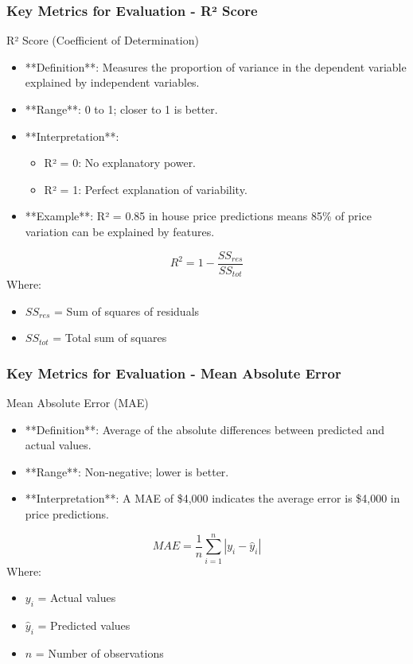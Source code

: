 \documentclass[aspectratio=169]{beamer}
\begin{document}
\begin{frame}[fragile]
    \frametitle{Key Metrics for Evaluation - R² Score}
    \begin{block}{R² Score (Coefficient of Determination)}
        \begin{itemize}
            \item **Definition**: Measures the proportion of variance in the dependent variable explained by independent variables.
            \item **Range**: 0 to 1; closer to 1 is better.
            \item **Interpretation**:
            \begin{itemize}
                \item R² = 0: No explanatory power.
                \item R² = 1: Perfect explanation of variability.
            \end{itemize}
            \item **Example**: R² = 0.85 in house price predictions means 85\% of price variation can be explained by features.
        \end{itemize}
    \end{block}

    \begin{equation} 
        R^2 = 1 - \frac{SS_{res}}{SS_{tot}} 
    \end{equation}
    Where:
    \begin{itemize}
        \item $SS_{res}$ = Sum of squares of residuals
        \item $SS_{tot}$ = Total sum of squares
    \end{itemize}
\end{frame}

\begin{frame}[fragile]
    \frametitle{Key Metrics for Evaluation - Mean Absolute Error}
    \begin{block}{Mean Absolute Error (MAE)}
        \begin{itemize}
            \item **Definition**: Average of the absolute differences between predicted and actual values.
            \item **Range**: Non-negative; lower is better.
            \item **Interpretation**: A MAE of \$4,000 indicates the average error is \$4,000 in price predictions.
        \end{itemize}
    \end{block}

    \begin{equation} 
        MAE = \frac{1}{n} \sum_{i=1}^{n} |y_i - \hat{y}_i| 
    \end{equation}
    Where:
    \begin{itemize}
        \item $y_i$ = Actual values
        \item $\hat{y}_i$ = Predicted values
        \item $n$ = Number of observations
    \end{itemize}
\end{frame}
\end{document}
